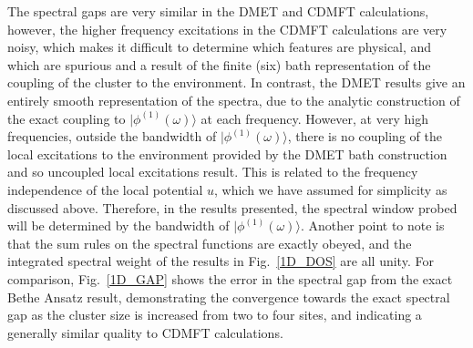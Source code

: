 \documentclass[aps,twocolumn,nobibnotes]{revtex4}
\begin{document}
The spectral gaps are very similar in the DMET and CDMFT calculations, however, the higher frequency excitations in the CDMFT calculations are very noisy, which makes it difficult to determine 
which features are physical, and which are spurious and a result of the finite (six) bath representation of the coupling of the cluster to the environment. In contrast, the DMET results give an entirely smooth
representation of the spectra, due to the analytic construction of the exact coupling to $|\phi^{(1)}(\omega)\rangle$ at each frequency. However, 
at very high frequencies, outside the bandwidth of $|\phi^{(1)}(\omega)\rangle$, there is no coupling of the local excitations to the 
environment provided by the DMET bath construction and so uncoupled local excitations result. This is related to the frequency 
independence of the local potential $u$, which we have assumed for simplicity as discussed above. 
Therefore, in the results presented, the spectral window probed will be determined by the bandwidth of $|\phi^{(1)}(\omega)\rangle$. Another point to note is that the sum rules on the spectral functions are
exactly obeyed, and the integrated spectral weight of the results in Fig.~\ref{1D_DOS} are all unity.
For comparison, Fig.~\ref{1D_GAP} shows the error in the spectral gap from the exact Bethe Ansatz result\cite{Ovchinni1970}, demonstrating 
the convergence towards the exact spectral gap as the cluster size is increased 
from two to four sites, and indicating a generally similar quality to CDMFT calculations.
\end{document}

